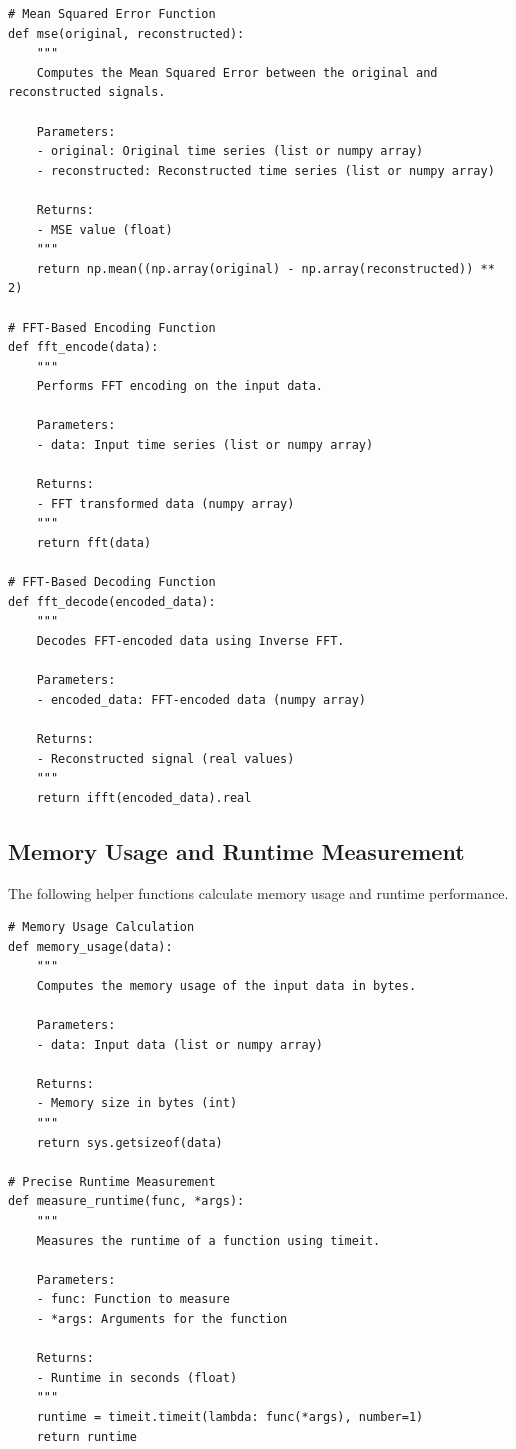 \documentclass[onecolumn,conference]{IEEEtran}
\begin{document}
\begin{verbatim}
# Mean Squared Error Function
def mse(original, reconstructed):
    """
    Computes the Mean Squared Error between the original and reconstructed signals.

    Parameters:
    - original: Original time series (list or numpy array)
    - reconstructed: Reconstructed time series (list or numpy array)

    Returns:
    - MSE value (float)
    """
    return np.mean((np.array(original) - np.array(reconstructed)) ** 2)

# FFT-Based Encoding Function
def fft_encode(data):
    """
    Performs FFT encoding on the input data.

    Parameters:
    - data: Input time series (list or numpy array)

    Returns:
    - FFT transformed data (numpy array)
    """
    return fft(data)

# FFT-Based Decoding Function
def fft_decode(encoded_data):
    """
    Decodes FFT-encoded data using Inverse FFT.

    Parameters:
    - encoded_data: FFT-encoded data (numpy array)

    Returns:
    - Reconstructed signal (real values)
    """
    return ifft(encoded_data).real
\end{verbatim}

\subsection{Memory Usage and Runtime Measurement}
The following helper functions calculate memory usage and runtime performance.

\begin{verbatim}
# Memory Usage Calculation
def memory_usage(data):
    """
    Computes the memory usage of the input data in bytes.

    Parameters:
    - data: Input data (list or numpy array)

    Returns:
    - Memory size in bytes (int)
    """
    return sys.getsizeof(data)

# Precise Runtime Measurement
def measure_runtime(func, *args):
    """
    Measures the runtime of a function using timeit.

    Parameters:
    - func: Function to measure
    - *args: Arguments for the function

    Returns:
    - Runtime in seconds (float)
    """
    runtime = timeit.timeit(lambda: func(*args), number=1)
    return runtime
\end{verbatim}
\end{document}
